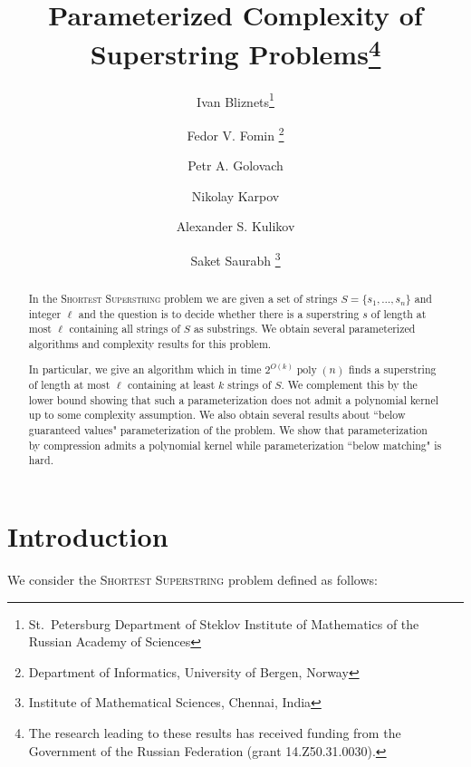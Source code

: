 \documentclass[11pt]{article}
\begin{document}
\title{Parameterized Complexity of Superstring Problems\thanks{The research leading to these results has received funding from the 
Government of the Russian Federation (grant 14.Z50.31.0030).}}

\author{
Ivan Bliznets\thanks{St.~Petersburg Department of Steklov Institute of Mathematics of the Russian Academy of Sciences} \addtocounter{footnote}{-1}
\and
Fedor V. Fomin \footnotemark {} \thanks{Department of Informatics, University of Bergen, Norway}  \addtocounter{footnote}{-2} 
\and
Petr A. Golovach \footnotemark {}  \footnotemark \addtocounter{footnote}{-2}
\and
Nikolay Karpov \footnotemark \addtocounter{footnote}{-1}
\and
Alexander S. Kulikov \footnotemark 
\and
Saket Saurabh \footnotemark {} \thanks{Institute of Mathematical Sciences, Chennai, India}
}


\maketitle
\sloppy
\begin{abstract}
In the  \textsc{Shortest Superstring} problem we are given a set of  strings $S=\{s_1, \ldots, s_n\}$  and integer $\ell$ and the question is to decide whether there is a superstring $s$ of length at most  $\ell$ containing all strings of $S$ as substrings. We obtain several parameterized algorithms and complexity results for this problem. 

In particular, we give an algorithm which in time $2^{O(k)} \operatorname{poly}(n)$ finds a superstring of length at most $\ell$ containing at least $k$ strings of $S$. We  complement this by the lower bound showing that such a  parameterization does not admit a polynomial kernel up to some complexity assumption. We also obtain several results about ``below guaranteed values" parameterization of the problem. We show that parameterization by compression admits a polynomial   kernel while parameterization ``below matching" is hard.  
\end{abstract}


\section{Introduction}
We consider the \textsc{Shortest Superstring} problem defined as follows:\\
\end{document}
